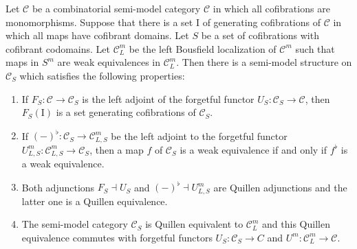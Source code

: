 \documentclass[reqno]{amsart}
\theoremstyle{definition}
\theoremstyle{remark}
\newcommand{\fs}[1]{\mathrm{#1}}
\newcommand{\cat}[1]{\mathcal{#1}}
\newcommand{\C}{\cat{C}}
\newcommand{\I}{\fs{I}}
\numberwithin{figure}{section}
\begin{document}
\begin{thm}
Let $\C$ be a combinatorial semi-model category $\C$ in which all cofibrations are monomorphisms.
Suppose that there is a set $\I$ of generating cofibrations of $\C$ in which all maps have cofibrant domains.
Let $S$ be a set of cofibrations with cofibrant codomains.
Let $\C^m_L$ be the left Bousfield localization of $\C^m$ such that maps in $S^m$ are weak equivalences in $\C^m_L$.
Then there is a semi-model structure on $\C_S$ which satisfies the following properties:
\begin{enumerate}
\item \label{it:alg-cof} If $F_S : \C \to \C_S$ is the left adjoint of the forgetful functor $U_S : \C_S \to \C$, then $F_S(\I)$ is a set generating cofibrations of $\C_S$.
\item \label{it:alg-we} If $(-)^\flat : \C_S \to \C^m_{L,S}$ be the left adjoint to the forgetful functor $U^m_{L,S} : \C^m_{L,S} \to \C_S$, then a map $f$ of $\C_S$ is a weak equivalence if and only if $f^\flat$ is a weak equivalence.
\item Both adjunctions $F_S \dashv U_S$ and $(-)^\flat \dashv U^m_{L,S}$ are Quillen adjunctions and the latter one is a Quillen equivalence.
\item \label{it:alg-qe} The semi-model category $\C_S$ is Quillen equivalent to $\C^m_L$ and this Quillen equivalence commutes with forgetful functors $U_S : \C_S \to C$ and $U^m : \C^m_L \to \C$.
\end{enumerate}
\end{thm}
\end{document}
